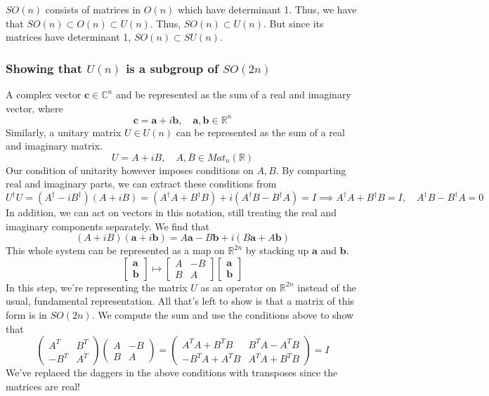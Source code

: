 \documentclass[11pt, oneside]{article}   	%
\theoremstyle{slanted}
\begin{document}
$SO(n)$ consists of matrices in $O(n)$ which have determinant 1. Thus, we have that $SO(n) \subset O(n) \subset U(n)$. Thus, $SO(n) \subset U(n)$. But since its matrices have determinant 1, $SO(n) \subset SU(n)$. 

\subsubsection*{Showing that $U(n)$ is a subgroup of $SO(2n)$} 
A complex vector $\mathbf{c} \in \mathbb{C}^n$ and be represented as the sum of a real and imaginary vector, where 
\[ 
\mathbf{c} = \mathbf{a} + i \mathbf{b}, \quad \mathbf{a}, \mathbf{b} \in \mathbb{R}^n 
\] 
Similarly, a unitary matrix $U \in U ( n) $ can be represented as the sum of a real and imaginary matrix. 
\[ 
U  = A + i B, \quad A, B \in Mat_n (\mathbb{R} ) 
\] 
Our condition of unitarity however imposes conditions on $A, B$. By comparting real and imaginary parts, we can extract these conditions from 
\[ 
U^\dagger U = (A^\dagger - i B^\dagger)( A + iB ) = (A^\dagger A  + B^\dagger B ) + i ( A^\dagger B - B^\dagger A ) = I \implies A^\dagger A + B^\dagger B = I, \quad A^\dagger B - B^\dagger A  = 0 
\] 
In addition, we can act on vectors in this notation, still treating the real and imaginary components separately. We find that 
\[ 
( A + iB)( \mathbf{a} + i \mathbf{b}) =  A\mathbf{a} - B\mathbf{b} + i (B \mathbf{a}  + A \mathbf{b} ) 
\] 
This whole system can be represented as a map on $\mathbb{R}^{2n}$ by stacking up $\mathbf{a}$ and $\mathbf{b}$. 
\[ 
\begin{bmatrix} \mathbf{a} \\ \mathbf{b} \end{bmatrix} \mapsto \begin{bmatrix} A & -B \\ B & A \end{bmatrix} \begin{bmatrix} \mathbf{a} \\ \mathbf{b} \end{bmatrix} 
\] 
In this step, we're representing the matrix $U$ as an operator on $\mathbb{R}^{ 2n}$ instead of the usual, fundamental representation. All that's left to show is that a matrix of this form is in $SO ( 2n)$. We compute the sum and use the conditions above to show that 
\[ 
\begin{pmatrix} A^T & B^T \\  - B^T & A^T \end{pmatrix} \begin{pmatrix} A & - B \\ B & A \end{pmatrix}  = \begin{pmatrix} A^T A + B^T B & B^T A - A^T B \\  - B^T  A + A^T B & A^T A + B^T B \end{pmatrix}  = I 
\] 
We've replaced the daggers in the above conditions with transposes since the matrices are real! 
\end{document}
